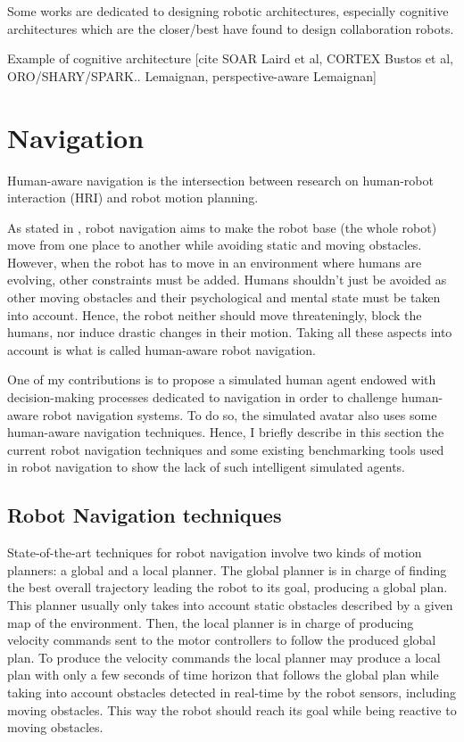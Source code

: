 Some works are dedicated to designing robotic architectures, especially cognitive architectures which are the closer/best have found to design collaboration robots. 

Example of cognitive architecture
[cite SOAR Laird et al, CORTEX Bustos et al, ORO/SHARY/SPARK.. Lemaignan, perspective-aware Lemaignan]

\section{Navigation}

Human-aware navigation is the intersection between research on human-robot interaction (HRI) and robot motion planning.

As stated in \cite{thesisBuisan21}, robot navigation aims to make the robot base (the whole robot) move from one place to another while avoiding static and moving obstacles. However, when the robot has to move in an environment where humans are evolving, other constraints must be added. 
Humans shouldn't just be avoided as other moving obstacles and their psychological and mental state must be taken into account. Hence, the robot neither should move threateningly, block the humans, nor induce drastic changes in their motion. Taking all these aspects into account is what is called human-aware robot navigation.

One of my contributions is to propose a simulated human agent endowed with decision-making processes dedicated to navigation in order to challenge human-aware robot navigation systems. To do so, the simulated avatar also uses some human-aware navigation techniques. Hence, I briefly describe in this section the current robot navigation techniques and some existing benchmarking tools used in robot navigation to show the lack of such intelligent simulated agents.

\subsection{Robot Navigation techniques}

State-of-the-art techniques for robot navigation involve two kinds of motion planners: a global and a local planner. The global planner is in charge of finding the best overall trajectory leading the robot to its goal, producing a global plan. This planner usually only takes into account static obstacles described by a given map of the environment. Then, the local planner is in charge of producing velocity commands sent to the motor controllers to follow the produced global plan. To produce the velocity commands the local planner may produce a local plan with only a few seconds of time horizon that follows the global plan while taking into account obstacles detected in real-time by the robot sensors, including moving obstacles. This way the robot should reach its goal while being reactive to moving obstacles. 

